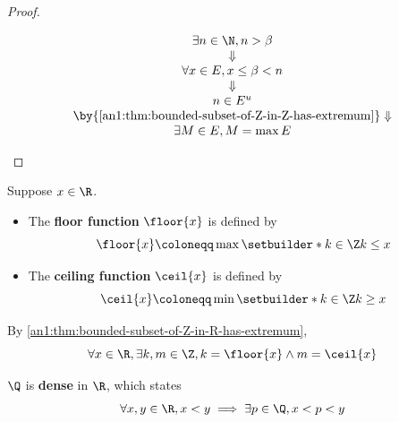 \begin{proof}
\begin{enumerate}[label=\textbf{(\Alph*)}]
          \[
            \begin{array}{c}
              \exists n \in \N, n > \beta                                          \\
              \Downarrow                                                           \\
              \forall x \in E, x \leq \beta < n                                    \\
              \Downarrow                                                           \\
              n \in E^{u}                                                          \\
              \by{\Cref{an1:thm:bounded-subset-of-Z-in-Z-has-extremum}} \Downarrow \\
              \exists M \in E, M = \max E
            \end{array}
          \]
  \end{enumerate}
\end{proof}

\begin{definition} \label{an1:def:floor-ceiling-functions}
  Suppose $x \in \R$.
  \begin{itemize}
    \item The \textbf{floor function} $\floor{x}$ is defined by
          \[
            \floor{x} \coloneqq \max\setbuilder*{k \in \Z}{k \leq x}
          \]
    \item The \textbf{ceiling function} $\ceil{x}$ is defined by
          \[
            \ceil{x} \coloneqq \min\setbuilder*{k \in \Z}{k \geq x}
          \]
  \end{itemize}
  By \cref{an1:thm:bounded-subset-of-Z-in-R-has-extremum},
  \[
    \forall x \in \R, \exists k, m \in \Z, k = \floor{x} \land m = \ceil{x}
  \]
\end{definition}

\begin{theorem} \label{an1:thm:Q-is-dense-in-R}
  $\Q$ is \textbf{dense} in $\R$, which states
  \[
    \forall x,y \in \R, x < y \implies \exists p \in \Q, x < p < y
  \]
\end{theorem}

